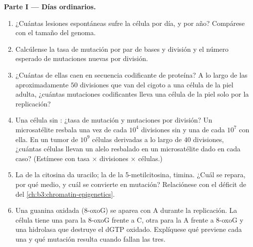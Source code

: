 \begin{problem}
\medskip
\noindent\textbf{Parte I --- Días ordinarios.}
\begin{enumerate}
  \item ¿Cuántas lesiones espontáneas sufre la célula por día, y por
        año? Compárese con el tamaño del genoma.
  \item Calcúlense la tasa de mutación por par de bases y división y el
        número esperado de mutaciones nuevas por división.
  \item ¿Cuántas de ellas caen en secuencia codificante de proteína? A lo
        largo de las aproximadamente $50$ divisiones que van del cigoto a
        una célula de la piel adulta, ¿cuántas mutaciones codificantes
        lleva una célula de la piel solo por la replicación?
  \item Una célula sin : ¿tasa de
        mutación y mutaciones por división? Un microsatélite resbala una
        vez de cada $10^{4}$ divisiones sin  y una de cada $10^{7}$ con ella. En un tumor de
        $10^{9}$ células derivadas a lo largo de $40$ divisiones,
        ¿cuántas células llevan un alelo resbalado en un microsatélite
        dado en cada caso? (Estímese con tasa $\times$ divisiones
        $\times$ células.)
  \item La  de la citosina da uracilo; la de la
        5-metilcitosina, timina. ¿Cuál se repara, por qué medio, y cuál
        se convierte en mutación? Relaciónese con el déficit de  del
        \cref{ch:b3:chromatin-epigenetics}.
  \item Una guanina oxidada (8-oxoG) se aparea con A durante la
        replicación. La célula tiene una  para la 8-oxoG
        frente a C, otra para la A frente a 8-oxoG y una hidrolasa que
        destruye el dGTP oxidado. Explíquese qué previene cada una y qué
        mutación resulta cuando fallan las tres.
\end{enumerate}


\end{problem}
